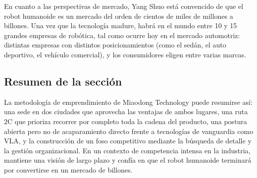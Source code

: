 En cuanto a las perspectivas de mercado, Yang Shuo está convencido de que el robot humanoide es un mercado del orden de cientos de miles de millones a billones. Una vez que la tecnología madure, habrá en el mundo entre 10 y 15 grandes empresas de robótica, tal como ocurre hoy en el mercado automotriz: distintas empresas con distintos posicionamientos (como el sedán, el auto deportivo, el vehículo comercial), y los consumidores eligen entre varias marcas.

\subsection{Resumen de la sección}

La metodología de emprendimiento de Miaodong Technology puede resumirse así: una sede en dos ciudades que aprovecha las ventajas de ambos lugares, una ruta 2C que prioriza recorrer por completo toda la cadena del producto, una postura abierta pero no de acaparamiento directo frente a tecnologías de vanguardia como VLA, y la construcción de un foso competitivo mediante la búsqueda de detalle y la gestión organizacional. En un contexto de competencia intensa en la industria, mantiene una visión de largo plazo y confía en que el robot humanoide terminará por convertirse en un mercado de billones.

